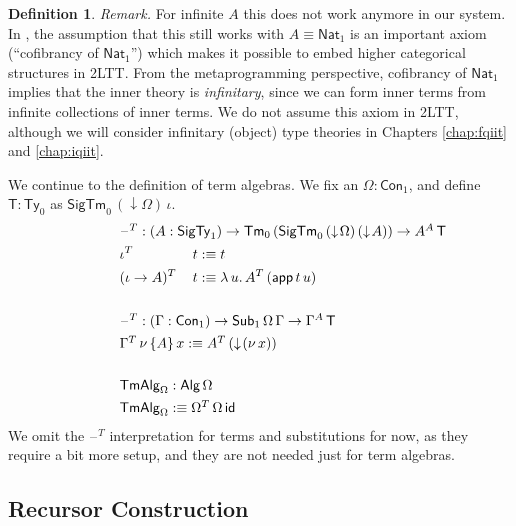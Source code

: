 \documentclass[12pt,a4paper,twoside,openany]{book}
\theoremstyle{remark}
\theoremstyle{definition}
\newtheorem{mydefinition}{Definition}
\theoremstyle{theorem}
\newcommand{\ms}[1]{\mathsf{#1}}
\newcommand{\id}{\mathsf{id}}
\newcommand{\Con}{\mathsf{Con}}
\newcommand{\Sub}{\mathsf{Sub}}
\newcommand{\Tm}{\mathsf{Tm}}
\newcommand{\Ty}{\mathsf{Ty}}
\newcommand{\blank}{\mathord{\hspace{1pt}\text{--}\hspace{1pt}}}
\newcommand{\SigTy}{\mathsf{SigTy}}
\newcommand{\SigTm}{\mathsf{SigTm}}
\newcommand{\app}{\ms{app}}
\newcommand{\Alg}{\ms{Alg}}
\newcommand{\TmAlg}{\ms{TmAlg}}
\newcommand{\Nat}{\ms{Nat}}
\newcommand{\down}{\downarrow}
\newcommand{\defn}{:\equiv}
\begin{document}
\begin{mydefinition}
\emph{Remark.} For infinite $A$ this does not work anymore in our system. In
\cite{twolevel}, the assumption that this still works with $A \equiv \Nat_1$ is
an important axiom (``cofibrancy of $\Nat_1$'') which makes it possible to embed
higher categorical structures in 2LTT. From the metaprogramming perspective,
cofibrancy of $\Nat_1$ implies that the inner theory is \emph{infinitary}, since
we can form inner terms from infinite collections of inner terms. We do not
assume this axiom in 2LTT, although we will consider infinitary (object) type
theories in Chapters \ref{chap:fqiit} and \ref{chap:iqiit}.
\end{mydefinition}

\noindent
We continue to the definition of term algebras. We fix an $\Omega : \Con_1$, and
define $\ms{T} : \Ty_0$ as $\SigTm_0\,(\down\!\Omega)\,\iota$.
\begingroup
\allowdisplaybreaks
\begin{alignat*}{3}
  & \hspace{-5em}\rlap{$\blank^T : (A : \SigTy_1) \to \Tm_0\,(\SigTm_0\,(\down\!\Omega)\,(\down\!A)) \to A^A\,\ms{T}$} \\
  & \hspace{-5em}\iota^T\,&&t \defn t \\
  & \hspace{-5em}(\iota\to A)^T\,&&t \defn \lambda\,u.\,A^T\,(\app\,t\,u)\\
  & \hspace{-5em}&&\\
  & \hspace{-5em}\rlap{$\blank^T : (\Gamma : \Con_1) \to \Sub_1\,\Omega\,\Gamma \to \Gamma^A\,\ms{T}$}\\
  & \hspace{-5em}\rlap{$\Gamma^T\,\nu\,\{A\}\,x \defn A^T\,(\down\!(\nu\,x))$}\\
  & \hspace{-5em} && \\
  & \hspace{-5em}\rlap{$\TmAlg_{\Omega} : \Alg\,\Omega$}\\
  & \hspace{-5em}\rlap{$\TmAlg_{\Omega} \defn \Omega^T\,\Omega\,\id$}
\end{alignat*}
\endgroup
We omit the $\blank^T$ interpretation for terms and substitutions for now, as
they require a bit more setup, and they are not needed just for term algebras.

\subsection{Recursor Construction}
\end{document}
